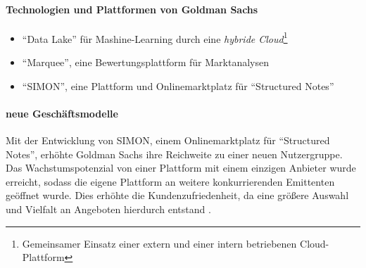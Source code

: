 \paragraph{Technologien und Plattformen von Goldman Sachs}
\label{goldman:plattform}
\begin{itemize}
    \item \enquote{Data Lake} für Mashine-Learning durch eine \emph{hybride Cloud}\footnote{Gemeinsamer Einsatz einer extern und einer intern betriebenen Cloud-Plattform}
    \item \enquote{Marquee}, eine Bewertungsplattform für Marktanalysen
    \item \enquote{SIMON}, eine Plattform und Onlinemarktplatz für \enquote{Structured Notes}
\end{itemize}

\paragraph{neue Geschäftsmodelle}
Mit der Entwicklung von SIMON, einem Onlinemarktplatz für \enquote{Structured Notes}, erhöhte Goldman Sachs ihre Reichweite zu einer neuen Nutzergruppe. Das Wachstumspotenzial von einer Plattform mit einem einzigen Anbieter wurde erreicht, sodass die eigene Plattform an weitere konkurrierenden Emittenten geöffnet wurde. Dies erhöhte die Kundenzufriedenheit, da eine größere Auswahl und Vielfalt an Angeboten hierdurch entstand \cite{Gupta:2017}.

